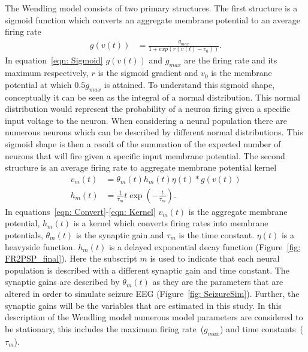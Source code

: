 The Wendling model consists of two primary structures. The first structure is a sigmoid function which converts an aggregate membrane potential to an average firing rate\begin{align}%
\label{eqn: Sigmoid}
g(v(t)) &= \frac{g_{max}}{1+exp(r(v(t)-v_{0}))}. \end{align}  In equation~\ref{eqn: Sigmoid} $g(v(t))$ and $g_{max}$ are the firing rate and its maximum respectively, $r$ is the sigmoid gradient and $v_{0}$ is the membrane potential at which $0.5g_{max}$ is attained. To understand this sigmoid shape, conceptually it can be seen as the integral of a normal distribution. This normal distribution would represent the probability of a neuron firing given a specific input voltage to the neuron. When considering a neural population there are numerous neurons which can be described by different normal distributions. This sigmoid shape is then a result of the summation of the expected number of neurons that will fire given a specific input membrane potential. %
The second structure is an average firing rate to aggregate membrane potential kernel \begin{align} %
\label{eqn: Convert}
v_{m}(t) &= \theta_{m}(t)h_{m}(t)\eta(t)*g(v(t))\\
\label{eqn: Kernel} 
h_{m}(t) &= \frac{1}{\tau_{m}}t\exp\left(-\frac{t}{\tau_{m}}\right). \end{align} In equations~\ref{eqn: Convert}-\ref{eqn: Kernel} $v_{m}(t)$ is the aggregate membrane potential, $h_{m}(t)$ is a kernel which converts firing rates into membrane potentials, $\theta_{m}(t)$ is the synaptic gain and $\tau_{m}$ is the time constant. $\eta(t)$ is a heavyside function. $h_{m}(t)$ is a delayed exponential decay function (Figure~\ref{fig: FR2PSP_final}). Here the subscript $m$ is used to indicate that each neural population is described with a different synaptic gain and time constant. The synaptic gains are described by $\theta_{m}(t)$ as they are the parameters that are altered in order to simulate seizure EEG (Figure~\ref{fig: SeizureSim}). Further, the synaptic gains will be the variables that are estimated in this study. In this description of the Wendling model numerous model parameters are considered to be stationary, this includes the maximum firing rate~($g_{max}$) and time constants~($\tau_{m}$). 
